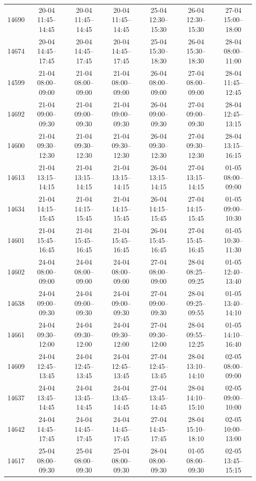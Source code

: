 \begin{table}[htbp]
\begin{tabular}{|r|c|c|c|c|c|c|}
14690 & 20-04 11:45--14:45 & 20-04 11:45--14:45 & 20-04 11:45--14:45 & 25-04 12:30--15:30 & 26-04 12:30--15:30 & 27-04 15:00--18:00 \\ 
14674 & 20-04 14:45--17:45 & 20-04 14:45--17:45 & 20-04 14:45--17:45 & 25-04 15:30--18:30 & 26-04 15:30--18:30 & 28-04 08:00--11:00 \\ 
14599 & 21-04 08:00--09:00 & 21-04 08:00--09:00 & 21-04 08:00--09:00 & 26-04 08:00--09:00 & 27-04 08:00--09:00 & 28-04 11:45--12:45 \\ 
14692 & 21-04 09:00--09:30 & 21-04 09:00--09:30 & 21-04 09:00--09:30 & 26-04 09:00--09:30 & 27-04 09:00--09:30 & 28-04 12:45--13:15 \\ 
14600 & 21-04 09:30--12:30 & 21-04 09:30--12:30 & 21-04 09:30--12:30 & 26-04 09:30--12:30 & 27-04 09:30--12:30 & 28-04 13:15--16:15 \\ 
14613 & 21-04 13:15--14:15 & 21-04 13:15--14:15 & 21-04 13:15--14:15 & 26-04 13:15--14:15 & 27-04 13:15--14:15 & 01-05 08:00--09:00 \\ 
14634 & 21-04 14:15--15:45 & 21-04 14:15--15:45 & 21-04 14:15--15:45 & 26-04 14:15--15:45 & 27-04 14:15--15:45 & 01-05 09:00--10:30 \\ 
14601 & 21-04 15:45--16:45 & 21-04 15:45--16:45 & 21-04 15:45--16:45 & 26-04 15:45--16:45 & 27-04 15:45--16:45 & 01-05 10:30--11:30 \\ 
14602 & 24-04 08:00--09:00 & 24-04 08:00--09:00 & 24-04 08:00--09:00 & 27-04 08:00--09:00 & 28-04 08:25--09:25 & 01-05 12:40--13:40 \\ 
14638 & 24-04 09:00--09:30 & 24-04 09:00--09:30 & 24-04 09:00--09:30 & 27-04 09:00--09:30 & 28-04 09:25--09:55 & 01-05 13:40--14:10 \\ 
14661 & 24-04 09:30--12:00 & 24-04 09:30--12:00 & 24-04 09:30--12:00 & 27-04 09:30--12:00 & 28-04 09:55--12:25 & 01-05 14:10--16:40 \\ 
14609 & 24-04 12:45--13:45 & 24-04 12:45--13:45 & 24-04 12:45--13:45 & 27-04 12:45--13:45 & 28-04 13:10--14:10 & 02-05 08:00--09:00 \\ 
14637 & 24-04 13:45--14:45 & 24-04 13:45--14:45 & 24-04 13:45--14:45 & 27-04 13:45--14:45 & 28-04 14:10--15:10 & 02-05 09:00--10:00 \\ 
14642 & 24-04 14:45--17:45 & 24-04 14:45--17:45 & 24-04 14:45--17:45 & 27-04 14:45--17:45 & 28-04 15:10--18:10 & 02-05 10:00--13:00 \\ 
14617 & 25-04 08:00--09:30 & 25-04 08:00--09:30 & 25-04 08:00--09:30 & 28-04 08:00--09:30 & 01-05 08:00--09:30 & 02-05 13:45--15:15 \\ 

\end{tabular}
\end{table}
